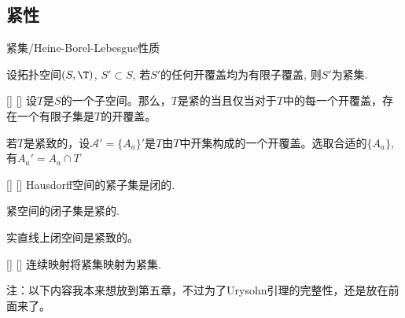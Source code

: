 \documentclass[UTF8]{ctexart}
\begin{document}
        \subsection{紧性}

            \begin{dfn}
                {紧集/Heine-Borel-Lebesgue性质}

                设拓扑空间$(S,\T)$, $S'\subset S$, 若$S'$的任何开覆盖均为有限子覆盖, 则$S'$为紧集. 
            \end{dfn}

            \begin{thm}
                []
                {}
                []
                []
                设\(T\)是\(S\)的一个子空间。那么，\(T\)是紧的当且仅当对于\(T\)中的每一个开覆盖，存在一个有限子集是\(T\)的开覆盖。
            \end{thm}
            
            \begin{prf}
                若\(T\)是紧致的，设\(\mathcal{A}'=\{A_{a}\} '\)是\(T\)由\(T\)中开集构成的一个开覆盖。选取合适的\(\{A_{a}\}\),有\(A_{a}'=A_{a}\cap T\)
            \end{prf}

            \begin{ppt}
                []
                {}
                []
                []
                Hausdorff空间的紧子集是闭的. 
                
                紧空间的闭子集是紧的.

                实直线上闭空间是紧致的。
            \end{ppt}
            
            \begin{ppt}
                []
                {}
                []
                []
                连续映射将紧集映射为紧集. 
            \end{ppt}

            注：以下内容我本来想放到第五章，不过为了Urysohn引理的完整性，还是放在前面来了。
\end{document}
